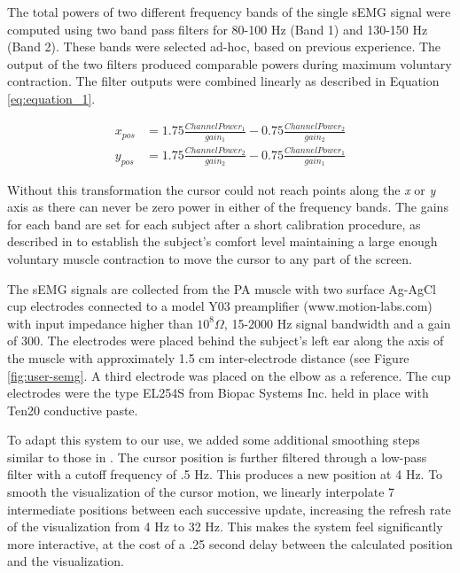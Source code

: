 The total powers of two different frequency bands of the single sEMG signal were computed using two band pass filters for 80-100 Hz (Band 1) and 130-150 Hz (Band 2). These bands were selected ad-hoc, based on previous experience. The output of the two filters produced comparable powers during maximum voluntary contraction. The filter outputs were combined linearly as described in Equation \ref{eq:equation_1}. 

\begin{subequations}
	\begin{align}
	x_{pos} &= 1.75 \frac{ChannelPower_1}{gain_1} - 0.75 \frac{ChannelPower_2}{gain_2}\\
	y_{pos} &= 1.75 \frac{ChannelPower_2}{gain_2} - 0.75 \frac{ChannelPower_1}{gain_1}
	\end{align}
	\label{eq:equation_1}
\end{subequations}

Without this transformation the cursor could not reach points along the \emph{x} or \emph{y} axis as there can never be zero power in either of the frequency bands. The gains for each band are set for each subject after a short calibration procedure, as described in \cite{JoshiTwoDimCursor} to establish the subject’s comfort level maintaining a large enough voluntary muscle contraction to move the cursor to any part of the screen.

The sEMG signals are collected from the PA muscle with two surface Ag-AgCl cup electrodes connected to a model Y03 preamplifier (www.motion-labs.com) with input impedance higher than $10^{8} \Omega$, 15-2000 Hz signal bandwidth and a gain of 300. The electrodes were placed behind the subject’s left ear along the axis of the muscle with approximately 1.5 cm inter-electrode distance (see Figure \ref{fig:user-semg}. A third electrode was placed on the elbow as a reference. The cup electrodes were the type EL254S from Biopac Systems Inc. held in place with Ten20 conductive paste. 

To adapt this system to our use, we added some additional smoothing steps similar to those in \cite{vernon2011}. The cursor position is further filtered through a low-pass filter with a cutoff frequency of .5 Hz. This produces a new position at 4 Hz. To smooth the visualization of the cursor motion, we linearly interpolate 7 intermediate positions between each successive update, increasing the refresh rate of the visualization from 4 Hz to 32 Hz. This makes the system feel significantly more interactive, at the cost of a .25 second delay between the calculated position and the visualization.

